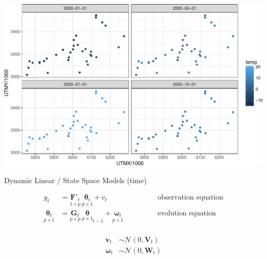 \documentclass[11pt,ignorenonframetext,]{beamer}
\begin{document}
\begin{frame}{}

\includegraphics{Lec23_files/figure-beamer/unnamed-chunk-2-1.pdf}

\end{frame}

\begin{frame}{Dynamic Linear / State Space Models (time)}

\[ 
\begin{aligned}
{{y}_t} &= \underset{1 \times p}{\bm{F}'_t} ~ \underset{p \times 1}{\bm{\theta}_t} + {{v}_t} 
&\qquad\qquad\text{observation equation}\\
\underset{p\times 1}{\bm\theta_t} &= \underset{p \times p}{\bm{G}_t} ~ \underset{p \times 1}{\bm\theta}_{t-1} + \underset{p \times 1}{\bm\omega_t}
&\qquad\qquad\text{evolution equation}\\
\end{aligned}
\]

\[ 
\begin{aligned}
\bm{v}_t &\sim \mathcal{N}(0,\bm{V}_t) \\
\bm\omega_t &\sim \mathcal{N}(0,\bm{W}_t) \\
\end{aligned}
\]

\end{frame}
\end{document}
